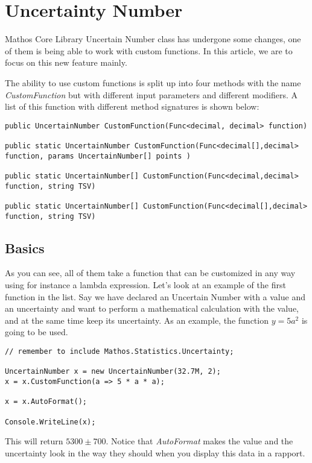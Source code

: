 
\chapter{Uncertainty Number}

Mathos Core Library Uncertain Number class has undergone some changes, one of them is being able to work with custom functions. In this article, we are to focus on this new feature mainly.

The ability to use custom functions is split up into four methods with the name \textit{CustomFunction} but with different input parameters and different modifiers. A list of this function with different method signatures is shown below:

\begin{lstlisting}
public UncertainNumber CustomFunction(Func<decimal, decimal> function)

public static UncertainNumber CustomFunction(Func<decimal[],decimal> function, params UncertainNumber[] points )

public static UncertainNumber[] CustomFunction(Func<decimal,decimal> function, string TSV)

public static UncertainNumber[] CustomFunction(Func<decimal[],decimal> function, string TSV)
\end{lstlisting}

\section{Basics}
As you can see, all of them take a function that can be customized in any way using for instance a lambda expression. Let's look at an example of the first function in the list. Say we have declared an Uncertain Number with a value and an uncertainty and want to perform a mathematical calculation with the value, and at the same time keep its uncertainty. As an example, the function $y=5a^2$ is going to be used.
\begin{lstlisting}
// remember to include Mathos.Statistics.Uncertainty;
 
UncertainNumber x = new UncertainNumber(32.7M, 2);
x = x.CustomFunction(a => 5 * a * a);
 
x = x.AutoFormat();
 
Console.WriteLine(x);
\end{lstlisting}
This will return $5300 \pm 700$. Notice that \textit{AutoFormat} makes the value and the uncertainty look in the way they should when you display this data in a rapport.

